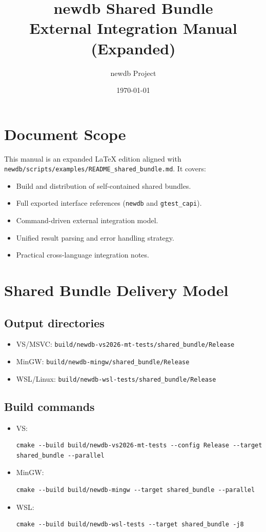 \documentclass[11pt,a4paper]{article}
\title{newdb Shared Bundle\\External Integration Manual (Expanded)}
\author{newdb Project}
\date{\today}
\begin{document}
\maketitle
\tableofcontents
\newpage

\section{Document Scope}
This manual is an expanded LaTeX edition aligned with
\texttt{newdb/scripts/examples/README\_shared\_bundle.md}. It covers:
\begin{itemize}
  \item Build and distribution of self-contained shared bundles.
  \item Full exported interface references (\texttt{newdb} and \texttt{gtest\_capi}).
  \item Command-driven external integration model.
  \item Unified result parsing and error handling strategy.
  \item Practical cross-language integration notes.
\end{itemize}

\section{Shared Bundle Delivery Model}
\subsection{Output directories}
\begin{itemize}
  \item VS/MSVC: \texttt{build/newdb-vs2026-mt-tests/shared\_bundle/Release}
  \item MinGW: \texttt{build/newdb-mingw/shared\_bundle/Release}
  \item WSL/Linux: \texttt{build/newdb-wsl-tests/shared\_bundle/Release}
\end{itemize}

\subsection{Build commands}
\begin{itemize}
  \item VS:
\begin{lstlisting}
cmake --build build/newdb-vs2026-mt-tests --config Release --target shared_bundle --parallel
\end{lstlisting}
  \item MinGW:
\begin{lstlisting}
cmake --build build/newdb-mingw --target shared_bundle --parallel
\end{lstlisting}
  \item WSL:
\begin{lstlisting}
cmake --build build/newdb-wsl-tests --target shared_bundle -j8
\end{lstlisting}
\end{itemize}
\end{document}
